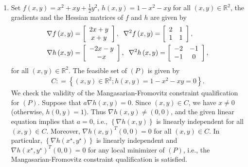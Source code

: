 \documentclass[a4paper]{article}
\numberwithin{equation}{section}
\begin{document}
\begin{enumerate}
\item Set $f\left( {x,y} \right) = {x^2} + xy + \frac{1}{2}{y^2}$, $h\left( {x,y} \right) = 1 - {x^2} - xy$ for all $\left(x,y\right)\in \mathbb{R}^2$, the gradients and the Hessian matrices of $f$ and $h$ are given by
\begin{align}
\nabla f\left( {x,y} \right) &= \left[ {\begin{array}{*{20}{c}}
{2x + y}\\
{x + y}
\end{array}} \right],\hspace{0.2cm} {\nabla ^2}f\left( {x,y} \right) = \left[ {\begin{array}{*{20}{c}}
2&1\\
1&1
\end{array}} \right],\\
\nabla h\left( {x,y} \right) &= \left[ {\begin{array}{*{20}{c}}
{ - 2x - y}\\
{ - x}
\end{array}} \right],\hspace{0.2cm} {\nabla ^2}h\left( {x,y} \right) = \left[ {\begin{array}{*{20}{c}}
{ - 2}&{ - 1}\\
{ - 1}&0
\end{array}} \right],
\end{align}
for all $\left(x,y\right)\in \mathbb{R}^2$. The feasible set of $\left(P\right)$ is given by
\begin{align}
C: = \left\{ {\left( {x,y} \right) \in {\mathbb{R}^2};h\left( {x,y} \right) = 1 - {x^2} - xy = 0} \right\}.
\end{align}
We check the validity of the Mangasarian-Fromovitz constraint qualification for $\left(P\right)$. Suppose that $a\nabla h\left( {x,y} \right) = 0$. Since $\left(x,y\right)\in C$, we have $x\ne 0$ (otherwise, $h\left(0,y\right)=1$). Thus $\nabla h\left( {x,y} \right) \ne \left(0,0\right)$, and the given linear equation implies that $a=0$, i.e., $\left\{ {\nabla h\left( {x,y} \right)} \right\}$ is linearly independent for all $\left(x,y\right)\in C$. Moreover, $\nabla h{\left( {x,y} \right)^T}\left( {0,0} \right) = 0$ for all $\left(x,y\right)\in C$. In particular, $\left\{ {\nabla h\left( {x^\star,y^\star} \right)} \right\}$ is linearly independent and $\nabla h{\left( {x^\star,y^\star} \right)^T}\left( {0,0} \right) = 0$ for any local minimizer of $\left(P\right)$, i.e., the Mangasarian-Fromovitz constraint qualification is satisfied.

\end{enumerate}
\end{document}
